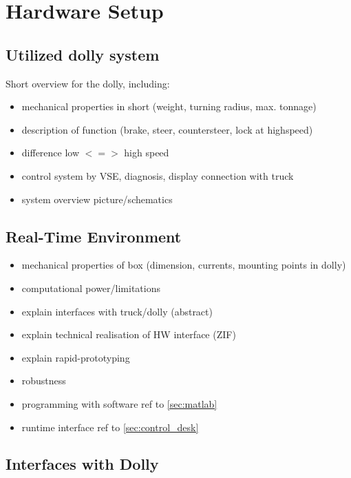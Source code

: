 \documentclass[ExampleMasters.tex]{subfiles}
\begin{document}
\clearpage


\chapter{Hardware Setup}
\label{chap:hardware_setup}
\section{Utilized dolly system}
\label{sec:dolly_system}

Short overview for the dolly, including: 

\begin{itemize}
\item mechanical properties in short (weight, turning radius, max. tonnage)
\item description of function (brake, steer, countersteer, lock at highspeed)
\item difference low $<=>$ high speed
\item control system by VSE, diagnosis, display connection with truck
\item system overview picture/schematics
\end{itemize}
\section{Real-Time Environment}
\label{sec:realtime_environment}

\begin{itemize}
	\item mechanical properties of box  (dimension, currents, mounting points in dolly)
	\item computational power/limitations
	\item explain interfaces with truck/dolly (abstract)
	\item explain technical realisation of HW interface (ZIF)
	\item explain rapid-prototyping
	\item robustness
	\item programming with software ref to \ref{sec:matlab}
	\item runtime interface ref to \ref{sec:control_desk}
\end{itemize}

\section{Interfaces with Dolly}
\label{sec:interface_with_dolly}
\end{document}
